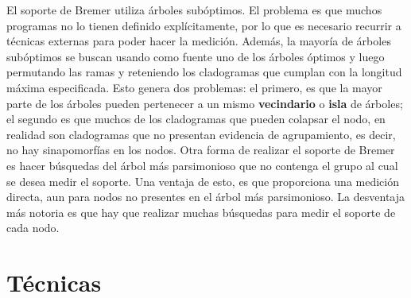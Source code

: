 El soporte de Bremer utiliza \'arboles sub\'optimos. El problema es que muchos programas no lo tienen definido expl\'icitamente, por lo que es necesario recurrir a t\'ecnicas externas para poder hacer la medici\'on. Adem\'as, la mayor\'ia de \'arboles sub\'optimos se buscan usando como fuente uno de los \'arboles \'optimos y luego permutando las ramas y reteniendo los cladogramas que cumplan con la longitud m\'axima especificada. Esto genera dos problemas: el primero, es que la mayor parte de los \'arboles pueden pertenecer a un mismo \textbf{vecindario} o \textbf{isla} de \'arboles; el segundo es que muchos de los cladogramas que pueden colapsar el nodo, en realidad son cladogramas que no presentan evidencia de agrupamiento, es decir, no hay sinapomorf\'ias en los nodos. Otra forma de realizar el soporte de Bremer es hacer b\'usquedas del \'arbol m\'as parsimonioso que no contenga el grupo al cual se desea medir el soporte. Una ventaja de esto, es que proporciona una medici\'on directa, aun para nodos no presentes en el \'arbol m\'as parsimonioso. La desventaja m\'as notoria es que hay que realizar muchas b\'usquedas para medir el soporte de cada nodo.





\section*{T\'ecnicas}

